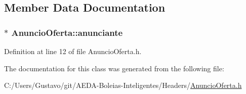 \subsection{Member Data Documentation}
\hypertarget{class_anuncio_oferta_a5de28c6a5a698a5ddabcf258c3c42d3c}{
\subsubsection[{anunciante}]{$\ast$ Anuncio\+Oferta\+::anunciante\hspace{0.3cm}{\ttfamily [private]}}}\label{class_anuncio_oferta_a5de28c6a5a698a5ddabcf258c3c42d3c}


Definition at line 12 of file Anuncio\+Oferta.\+h.



The documentation for this class was generated from the following file\+:\begin{DoxyCompactItemize}
\item 
C\+:/\+Users/\+Gustavo/git/\+A\+E\+D\+A-\/\+Boleias-\/\+Inteligentes/\+Headers/\hyperlink{_anuncio_oferta_8h}{Anuncio\+Oferta.\+h}\end{DoxyCompactItemize}
